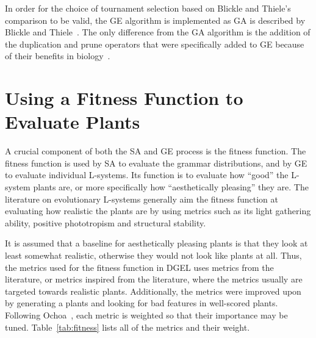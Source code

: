 In order for the choice of tournament selection based on Blickle and Thiele's comparison to be valid, the \gls{GE} algorithm is implemented as \gls{GA} is described by Blickle and Thiele~\cite{1995Blickle}.
The only difference from the \gls{GA} algorithm is the addition of the duplication and prune operators that were specifically added to \gls{GE} because of their benefits in biology~\cite{1998Ryan}. %

\section{Using a Fitness Function to Evaluate Plants}
A crucial component of both the \gls{SA} and \gls{GE} process is the fitness function.
The fitness function is used by \gls{SA} to evaluate the grammar distributions, and by \gls{GE} to evaluate individual \glspl{L-system}.
Its function is to evaluate how ``good'' the \gls{L-system} plants are, or more specifically how ``aesthetically pleasing'' they are.
The literature on evolutionary \glspl{L-system} generally aim the fitness function at evaluating how realistic the plants are by using metrics such as its light gathering ability, positive phototropism and structural stability.

It is assumed that a baseline for aesthetically pleasing plants is that they look at least somewhat realistic, otherwise they would not look like plants at all.
Thus, the metrics used for the fitness function in \gls{DGEL} uses metrics from the literature, or metrics inspired from the literature, where the metrics usually are targeted towards realistic plants.
Additionally, the metrics were improved upon by generating a plants and looking for bad features in well-scored plants.
Following Ochoa~\cite{1998Ochoa}, each metric is weighted so that their importance may be tuned.
Table~\ref{tab:fitness} lists all of the metrics and their weight.

